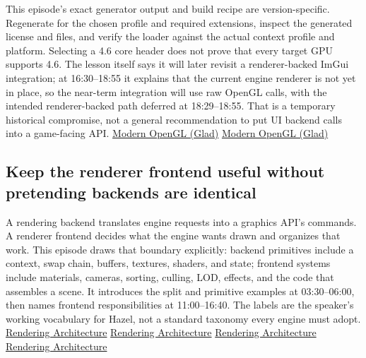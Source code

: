 This episode's exact generator output and build recipe are version-specific. Regenerate for the chosen profile and required extensions, inspect the generated license and files, and verify the loader against the actual context profile and platform. Selecting a 4.6 core header does not prove that every target GPU supports 4.6. The lesson itself says it will later revisit a renderer-backed ImGui integration; at 16:30--18:55 it explains that the current engine renderer is not yet in place, so the near-term integration will use raw OpenGL calls, with the intended renderer-backed path deferred at 18:29--18:55. That is a temporary historical compromise, not a general recommendation to put UI backend calls into a game-facing API. \href{https://www.youtube.com/watch?v=HFyHIc89z1g&t=990s}{Modern OpenGL (Glad)} \href{https://www.youtube.com/watch?v=HFyHIc89z1g&t=1109s}{Modern OpenGL (Glad)}

\subsection{Keep the renderer frontend useful without pretending backends are identical}\label{06-engine-ii-ch025-keep-the-renderer-frontend-useful-without-pretending-backends-are-identical}

\hypertarget{06-engine-ii-ch025-keep-the-renderer-frontend-useful-without-pretending-backends-are-identical}{}

A rendering backend translates engine requests into a graphics API's commands. A renderer frontend decides what the engine wants drawn and organizes that work. This episode draws that boundary explicitly: backend primitives include a context, swap chain, buffers, textures, shaders, and state; frontend systems include materials, cameras, sorting, culling, LOD, effects, and the code that assembles a scene. It introduces the split and primitive examples at 03:30--06:00, then names frontend responsibilities at 11:00--16:40. The labels are the speaker's working vocabulary for Hazel, not a standard taxonomy every engine must adopt. \href{https://www.youtube.com/watch?v=YPWNNmlIUIo&t=210s}{Rendering Architecture} \href{https://www.youtube.com/watch?v=YPWNNmlIUIo&t=330s}{Rendering Architecture} \href{https://www.youtube.com/watch?v=YPWNNmlIUIo&t=660s}{Rendering Architecture} \href{https://www.youtube.com/watch?v=YPWNNmlIUIo&t=890s}{Rendering Architecture}

